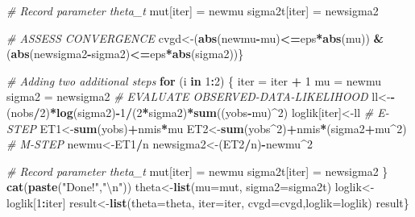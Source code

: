 \documentclass[]{article}
\newenvironment{Shaded}{\begin{snugshade}}{\end{snugshade}}
\newcommand{\CharTok}[1]{\textcolor[rgb]{0.31,0.60,0.02}{#1}}
\newcommand{\CommentTok}[1]{\textcolor[rgb]{0.56,0.35,0.01}{\textit{#1}}}
\newcommand{\ControlFlowTok}[1]{\textcolor[rgb]{0.13,0.29,0.53}{\textbf{#1}}}
\newcommand{\DataTypeTok}[1]{\textcolor[rgb]{0.13,0.29,0.53}{#1}}
\newcommand{\DecValTok}[1]{\textcolor[rgb]{0.00,0.00,0.81}{#1}}
\newcommand{\KeywordTok}[1]{\textcolor[rgb]{0.13,0.29,0.53}{\textbf{#1}}}
\newcommand{\NormalTok}[1]{#1}
\newcommand{\OperatorTok}[1]{\textcolor[rgb]{0.81,0.36,0.00}{\textbf{#1}}}
\newcommand{\StringTok}[1]{\textcolor[rgb]{0.31,0.60,0.02}{#1}}
\begin{document}
\begin{Shaded}
\begin{Highlighting}[]
  \CommentTok{# Record parameter theta_t}
\NormalTok{  mut[iter] =}\StringTok{ }\NormalTok{newmu}
\NormalTok{  sigma2t[iter] =}\StringTok{ }\NormalTok{newsigma2}
  
  \CommentTok{# ASSESS CONVERGENCE}
\NormalTok{  cvgd<-(}\KeywordTok{abs}\NormalTok{(newmu}\OperatorTok{-}\NormalTok{mu)}\OperatorTok{<=}\NormalTok{eps}\OperatorTok{*}\KeywordTok{abs}\NormalTok{(mu)) }\OperatorTok{&}\StringTok{ }\NormalTok{(}\KeywordTok{abs}\NormalTok{(newsigma2}\OperatorTok{-}\NormalTok{sigma2)}\OperatorTok{<=}\NormalTok{eps}\OperatorTok{*}\KeywordTok{abs}\NormalTok{(sigma2))\}}
  
  \CommentTok{# Adding two additional steps}
  \ControlFlowTok{for}\NormalTok{ (i }\ControlFlowTok{in} \DecValTok{1}\OperatorTok{:}\DecValTok{2}\NormalTok{) \{}
\NormalTok{    iter =}\StringTok{ }\NormalTok{iter }\OperatorTok{+}\StringTok{ }\DecValTok{1}
\NormalTok{    mu =}\StringTok{ }\NormalTok{newmu}
\NormalTok{    sigma2 =}\StringTok{ }\NormalTok{newsigma2}
    \CommentTok{# EVALUATE OBSERVED-DATA-LIKELIHOOD}
\NormalTok{    ll<-}\OperatorTok{-}\NormalTok{(nobs}\OperatorTok{/}\DecValTok{2}\NormalTok{)}\OperatorTok{*}\KeywordTok{log}\NormalTok{(sigma2)}\OperatorTok{-}\DecValTok{1}\OperatorTok{/}\NormalTok{(}\DecValTok{2}\OperatorTok{*}\NormalTok{sigma2)}\OperatorTok{*}\KeywordTok{sum}\NormalTok{((yobs}\OperatorTok{-}\NormalTok{mu)}\OperatorTok{^}\DecValTok{2}\NormalTok{)}
\NormalTok{    loglik[iter]<-ll}
    \CommentTok{# E-STEP}
\NormalTok{    ET1<-}\KeywordTok{sum}\NormalTok{(yobs)}\OperatorTok{+}\NormalTok{nmis}\OperatorTok{*}\NormalTok{mu}
\NormalTok{    ET2<-}\KeywordTok{sum}\NormalTok{(yobs}\OperatorTok{^}\DecValTok{2}\NormalTok{)}\OperatorTok{+}\NormalTok{nmis}\OperatorTok{*}\NormalTok{(sigma2}\OperatorTok{+}\NormalTok{mu}\OperatorTok{^}\DecValTok{2}\NormalTok{)}
    \CommentTok{# M-STEP}
\NormalTok{    newmu<-ET1}\OperatorTok{/}\NormalTok{n}
\NormalTok{    newsigma2<-(ET2}\OperatorTok{/}\NormalTok{n)}\OperatorTok{-}\NormalTok{newmu}\OperatorTok{^}\DecValTok{2}
  
    \CommentTok{# Record parameter theta_t}
\NormalTok{    mut[iter] =}\StringTok{ }\NormalTok{newmu}
\NormalTok{    sigma2t[iter] =}\StringTok{ }\NormalTok{newsigma2}
\NormalTok{  \}}
  \KeywordTok{cat}\NormalTok{(}\KeywordTok{paste}\NormalTok{(}\StringTok{"Done!"}\NormalTok{,}\StringTok{"}\CharTok{\textbackslash{}n}\StringTok{"}\NormalTok{))}
\NormalTok{  theta<-}\KeywordTok{list}\NormalTok{(}\DataTypeTok{mu=}\NormalTok{mut, }\DataTypeTok{sigma2=}\NormalTok{sigma2t)}
\NormalTok{  loglik<-loglik[}\DecValTok{1}\OperatorTok{:}\NormalTok{iter]}
\NormalTok{  result<-}\KeywordTok{list}\NormalTok{(}\DataTypeTok{theta=}\NormalTok{theta, }\DataTypeTok{iter=}\NormalTok{iter, }\DataTypeTok{cvgd=}\NormalTok{cvgd,}\DataTypeTok{loglik=}\NormalTok{loglik)}
\NormalTok{  result\}}


\end{Highlighting}
\end{Shaded}
\end{document}
